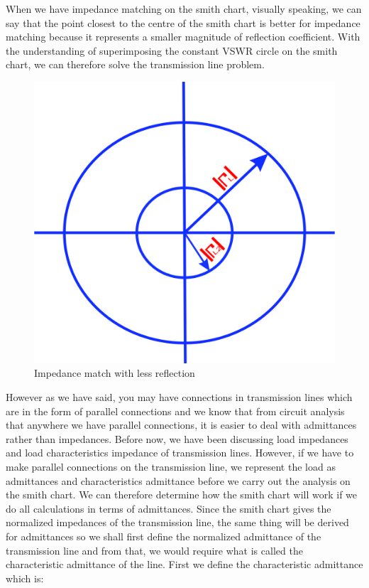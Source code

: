 When we have impedance matching on the smith chart, visually speaking, we can say that the point closest to the centre of the smith chart is better for impedance matching because it represents a smaller magnitude of reflection coefficient. With the understanding of superimposing the constant VSWR circle on the smith chart, we can therefore solve the transmission line problem.
\begin{figure}[h]
\centering
\includegraphics[width=0.57\linewidth]{./graphics/poiuyfd}
\caption{Impedance match with less reflection}
\label{fig:poiuyfd}
\end{figure}

However as we have said, you may have connections in transmission lines which are in the form of parallel connections and we know that from circuit analysis that anywhere we have parallel connections, it is easier to deal with admittances rather than impedances. Before now, we have been discussing load impedances and load characteristics impedance of transmission lines. However, if we have to make parallel connections on the transmission line, we represent the load as admittances and characteristics admittance before we carry out the analysis on the smith chart. We can therefore determine how the smith chart will work if we do all calculations in terms of admittances. Since the smith chart gives the normalized impedances of the transmission line, the same thing will be derived for admittances so we shall first define the normalized admittance of the transmission line and from that, we would require what is called the characteristic admittance of the line. First we define the characteristic admittance which is:
